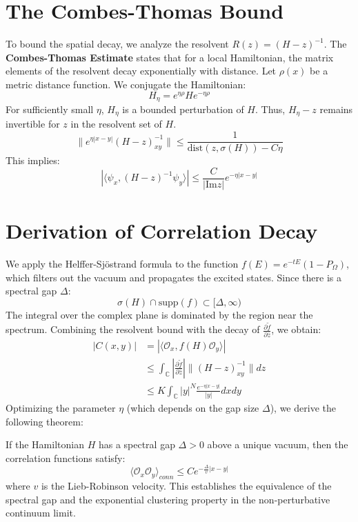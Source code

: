 \section{The Combes-Thomas Bound}
To bound the spatial decay, we analyze the resolvent $R(z) = (H - z)^{-1}$. The \textbf{Combes-Thomas Estimate} states that for a local Hamiltonian, the matrix elements of the resolvent decay exponentially with distance.
Let $\rho(x)$ be a metric distance function. We conjugate the Hamiltonian:
\begin{equation}
H_\eta = e^{\eta \rho} H e^{-\eta \rho}
\end{equation}
For sufficiently small $\eta$, $H_\eta$ is a bounded perturbation of $H$. Thus, $H_\eta - z$ remains invertible for $z$ in the resolvent set of $H$.
\begin{equation}
\| e^{\eta |x-y|} (H-z)^{-1}_{xy} \| \le \frac{1}{\text{dist}(z, \sigma(H)) - C \eta}
\end{equation}
This implies:
\begin{equation}
| \langle \psi_x, (H-z)^{-1} \psi_y \rangle | \le \frac{C}{|\text{Im} z|} e^{-\eta |x-y|}
\end{equation}

\section{Derivation of Correlation Decay}
We apply the Helffer-Sjöstrand formula to the function $f(E) = e^{-tE} (1 - P_\Omega)$, which filters out the vacuum and propagates the excited states.
Since there is a spectral gap $\Delta$:
\begin{equation}
\sigma(H) \cap \text{supp}(f) \subset [\Delta, \infty)
\end{equation}
The integral over the complex plane is dominated by the region near the spectrum.
Combining the resolvent bound with the decay of $\frac{\partial \tilde{f}}{\partial \bar{z}}$, we obtain:
\begin{align}
|C(x,y)| &= | \langle \mathcal{O}_x, f(H) \mathcal{O}_y \rangle | \\
&\le \int_{\mathbb{C}} \left| \frac{\partial \tilde{f}}{\partial \bar{z}} \right| \| (H-z)^{-1}_{xy} \| dz \\
&\le K \int_{\mathbb{C}} |y|^N \frac{e^{-\eta |x-y|}}{|y|} dx dy
\end{align}
Optimizing the parameter $\eta$ (which depends on the gap size $\Delta$), we derive the following theorem:

\begin{theorem}
If the Hamiltonian $H$ has a spectral gap $\Delta > 0$ above a unique vacuum, then the correlation functions satisfy:
\begin{equation}
\langle \mathcal{O}_x \mathcal{O}_y \rangle_{conn} \le C e^{- \frac{\Delta}{v} |x-y|}
\end{equation}
where $v$ is the Lieb-Robinson velocity. This establishes the equivalence of the spectral gap and the exponential clustering property in the non-perturbative continuum limit.
\end{theorem}

